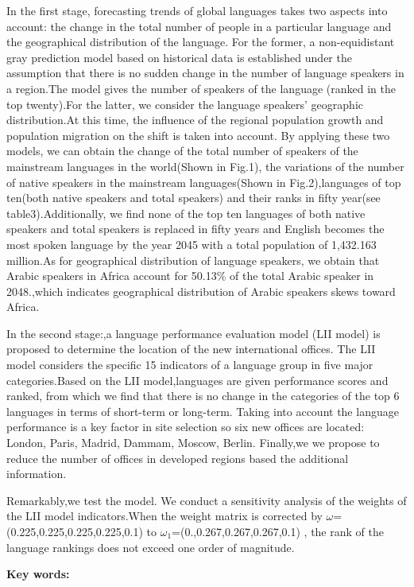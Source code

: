 \noindent In the first stage, forecasting trends of global languages takes two aspects into account: the change in the total number of people in a particular language and the geographical distribution of the language. For the former, a non-equidistant gray prediction model based on historical data is established under the assumption that there is no sudden change in the number of language speakers in a region.The model gives the number of speakers of the language (ranked in the top twenty).For the latter, we consider the language speakers' geographic distribution.At this time, the influence of the regional population growth and population migration on the shift is taken into account. By applying these two models, we can obtain the change of the total number of speakers of the mainstream languages in the world(Shown in Fig.1), the variations of the number of native speakers in the mainstream languages(Shown in Fig.2),languages of top ten(both native speakers and total speakers) and their ranks in fifty year(see table3).Additionally, we find none of the top ten languages of both native speakers and total speakers is replaced in fifty years and English becomes the most spoken language by the year 2045 with a total population of 1,432.163 million.As for geographical distribution of language speakers, we obtain that Arabic speakers in Africa account for 50.13\% of the total Arabic speaker in 2048.,which indicates geographical distribution of Arabic speakers skews toward Africa.
\par In the second stage:,a language performance evaluation model (LII model) is proposed to determine the location of the new international offices. The LII model considers the specific 15 indicators of a language group in five major categories.Based on the LII model,languages are given performance scores and ranked, from which we find that there is no change in the categories of the top 6 languages in terms of short-term or long-term. Taking into account the language performance is a key factor in site selection so six new offices are located: London, Paris,  Madrid, Dammam, Moscow, Berlin. Finally,we we propose to reduce the number of offices in developed regions based the additional information.
\par Remarkably,we test the model. We conduct a sensitivity analysis of the weights of the LII model indicators.When the weight matrix is corrected by $\omega $=\\(0.225,0.225,0.225,0.225,0.1) to ${\omega _1}$=(0.,0.267,0.267,0.267,0.1) , the rank of the language rankings does not exceed one order of magnitude.




\par
\noindent
\textbf{Key words:}
